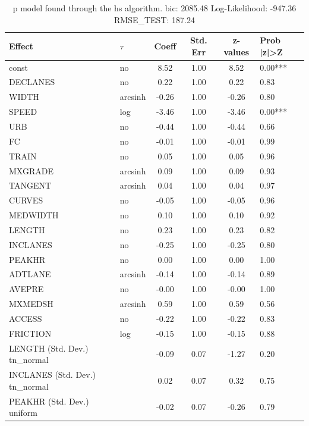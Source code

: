 \begin{table}
	\caption{p model found through the hs algorithm. bic: 2085.48 Log-Likelihood: -947.36 RMSE_TEST: 187.24}
	\begin{center}
		\begin{tabular}{|l|l|c|c|c|l|}
			\hline
			Effect & $\tau$ & Coeff & Std. Err & z-values & Prob |z|>Z \\
			\hline
			const & no & 8.52 & 1.00 & 8.52 & 0.00*** \\
			\hline
			DECLANES & no & 0.22 & 1.00 & 0.22 & 0.83 \\
			\hline
			WIDTH & arcsinh & -0.26 & 1.00 & -0.26 & 0.80 \\
			\hline
			SPEED & log & -3.46 & 1.00 & -3.46 & 0.00*** \\
			\hline
			URB & no & -0.44 & 1.00 & -0.44 & 0.66 \\
			\hline
			FC & no & -0.01 & 1.00 & -0.01 & 0.99 \\
			\hline
			TRAIN & no & 0.05 & 1.00 & 0.05 & 0.96 \\
			\hline
			MXGRADE & arcsinh & 0.09 & 1.00 & 0.09 & 0.93 \\
			\hline
			TANGENT & arcsinh & 0.04 & 1.00 & 0.04 & 0.97 \\
			\hline
			CURVES & no & -0.05 & 1.00 & -0.05 & 0.96 \\
			\hline
			MEDWIDTH & no & 0.10 & 1.00 & 0.10 & 0.92 \\
			\hline
			LENGTH & no & 0.23 & 1.00 & 0.23 & 0.82 \\
			\hline
			INCLANES & no & -0.25 & 1.00 & -0.25 & 0.80 \\
			\hline
			PEAKHR & no & 0.00 & 1.00 & 0.00 & 1.00 \\
			\hline
			ADTLANE & arcsinh & -0.14 & 1.00 & -0.14 & 0.89 \\
			\hline
			AVEPRE & no & -0.00 & 1.00 & -0.00 & 1.00 \\
			\hline
			MXMEDSH & arcsinh & 0.59 & 1.00 & 0.59 & 0.56 \\
			\hline
			ACCESS & no & -0.22 & 1.00 & -0.22 & 0.83 \\
			\hline
			FRICTION & log & -0.15 & 1.00 & -0.15 & 0.88 \\
			\hline
			LENGTH (Std. Dev.) tn_normal &  & -0.09 & 0.07 & -1.27 & 0.20 \\
			\hline
			INCLANES (Std. Dev.) tn_normal &  & 0.02 & 0.07 & 0.32 & 0.75 \\
			\hline
			PEAKHR (Std. Dev.) uniform &  & -0.02 & 0.07 & -0.26 & 0.79 \\

\end{tabular}
\end{center}
\end{table}
